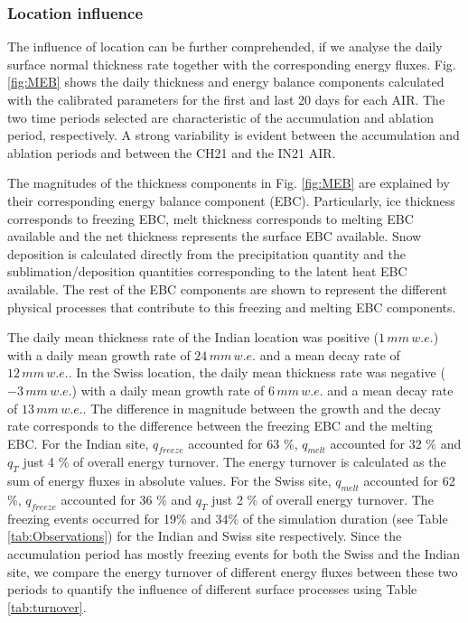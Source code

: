 \documentclass[utf8]{frontiersSCNS}
\begin{document}
\subsubsection{Location influence}

The influence of location can be further comprehended, if we analyse the daily surface normal thickness rate
together with the corresponding energy fluxes. Fig.  \ref{fig:MEB} shows the daily thickness and energy balance
components calculated with the calibrated parameters for the first and last 20 days for each AIR. The two time
periods selected are characteristic of the accumulation and ablation period, respectively. A strong variability is
evident between the accumulation and ablation periods and between the CH21 and the IN21 AIR.

The magnitudes of the thickness components in Fig. \ref{fig:MEB} are explained by their corresponding
energy balance component (EBC).  Particularly, ice thickness corresponds to freezing EBC, melt thickness
corresponds to melting EBC available and the net thickness represents the surface EBC available.  Snow
deposition is calculated directly from the precipitation quantity and the sublimation/deposition quantities
corresponding to the latent heat EBC available.  The rest of the EBC components are shown to represent the
different physical processes that contribute to this freezing and melting EBC components.

The daily mean thickness rate of the Indian location was positive ($1\, mm \,w.e.$) with a daily mean growth
rate of $24\, mm \,w.e.$ and a mean decay rate of $12\, mm \,w.e.$. In the Swiss location, the daily mean
thickness rate was negative ($-3\, mm \,w.e.$) with a daily mean growth rate of $6\, mm \,w.e.$ and a mean decay
rate of $13\, mm \,w.e.$. The difference in magnitude between the growth and the decay rate corresponds to the
difference between the freezing EBC and the melting EBC. For the Indian site, $q_{freeze}$ accounted for 63 \%,
$q_{melt}$ accounted for 32 \% and $q_{T}$ just 4 \% of overall energy turnover. The energy turnover is calculated
as the sum of energy fluxes in absolute values. For the Swiss site, $q_{melt}$ accounted for 62 \%, $q_{freeze}$
accounted for 36 \% and $q_{T}$ just 2 \% of overall energy turnover. The freezing events occurred for 19\% and
34\% of the simulation duration (see Table \ref{tab:Observations}) for the Indian and Swiss site respectively.
Since the accumulation period has mostly freezing events for both the Swiss and the Indian site, we compare the
energy turnover of different energy fluxes between these two periods to quantify the influence of different
surface processes using Table \ref{tab:turnover}. 
\end{document}
